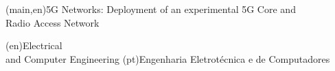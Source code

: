 
%




%
%
%
%
\nttitle(main,en){5G Networks: Deployment of an experimental 5G Core and\\Radio Access Network}%




%
%
%
%
\ntdepartment(en){Electrical\\ and Computer Engineering} %
\ntdepartment(pt){Engenharia Eletrotécnica e de Computadores}   %



